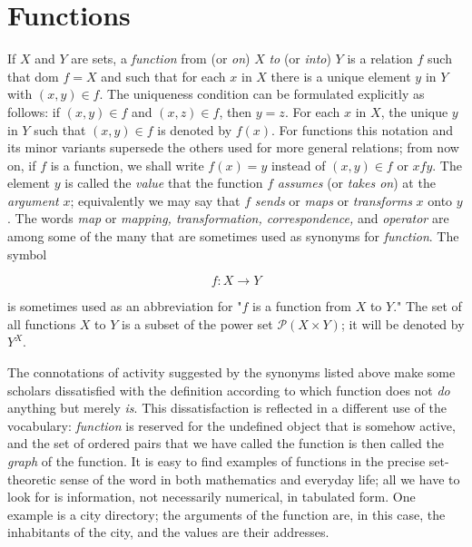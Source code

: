 
\chapter{Functions}

If $X$ and $Y$ are sets, a \textit{function} from (or \textit{on}) $X$ \textit{to} (or \textit{into}) $Y$ is a relation $f$ such that dom $f = X$ and such that for each $x$ in $X$ there is a unique element $y$ in $Y$ with $(x, y) \in f$. The uniqueness condition can be formulated explicitly as follows: if $(x, y) \in f$ and $(x, z) \in f$, then $y = z$. For each $x$ in $X$, the unique $y$ in $Y$ such that $(x, y) \in f$ is denoted by $f(x)$. For functions this notation and its minor variants supersede the others used for more general relations; from now on, if $f$ is a function, we shall write $f(x) = y$ instead of $(x, y) \in f$ or $x f y$. The element $y$ is called the \textit{value} that the function $f$ \textit{assumes} (or \textit{takes on}) at the \textit{argument} $x$; equivalently we may say that $f$ \textit{sends} or \textit{maps} or \textit{transforms} $x$ onto $y$. The words \textit{map} or \textit{mapping, transformation, correspondence,} and \textit{operator} are among some of the many that are sometimes used as synonyms for \textit{function}. The symbol

\begin{equation*}
f: X \rightarrow Y
\end{equation*}

is sometimes used as an abbreviation for "$f$ is a function from $X$ to $Y$." The set of all functions $X$ to $Y$ is a subset of the power set $\mathcal{P}(X \times Y)$; it will be denoted by $Y^{X}$. 

The connotations of activity suggested by the synonyms listed above make some scholars dissatisfied with the definition according to which function does not \textit{do} anything but merely \textit{is}. This dissatisfaction is reflected in a different use of the vocabulary: \textit{function} is reserved for the undefined object that is somehow active, and the set of ordered pairs that we have called the function is then called the \textit{graph} of the function. It is easy to find examples of functions in the precise set-theoretic sense of the word in both mathematics and everyday life; all we have to look for is information, not necessarily numerical, in tabulated form. One example is a city directory; the arguments of the function are, in this case, the inhabitants of the city, and the values are their addresses. 

